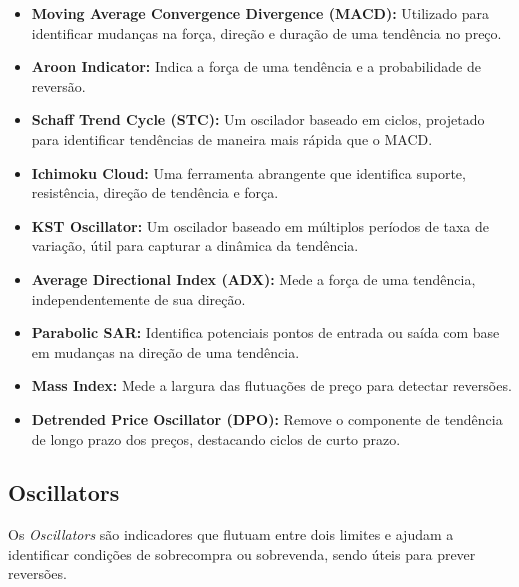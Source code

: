 \documentclass{article}
\begin{document}
\begin{itemize}
    \item \textbf{Moving Average Convergence Divergence (MACD):} Utilizado para identificar mudanças na força, direção e duração de uma tendência no preço.
    
    \item \textbf{Aroon Indicator:} Indica a força de uma tendência e a probabilidade de reversão.

    \item \textbf{Schaff Trend Cycle (STC):} Um oscilador baseado em ciclos, projetado para identificar tendências de maneira mais rápida que o MACD.

    \item \textbf{Ichimoku Cloud:} Uma ferramenta abrangente que identifica suporte, resistência, direção de tendência e força.

    \item \textbf{KST Oscillator:} Um oscilador baseado em múltiplos períodos de taxa de variação, útil para capturar a dinâmica da tendência.

    \item \textbf{Average Directional Index (ADX):} Mede a força de uma tendência, independentemente de sua direção.

    \item \textbf{Parabolic SAR:} Identifica potenciais pontos de entrada ou saída com base em mudanças na direção de uma tendência.

    \item \textbf{Mass Index:} Mede a largura das flutuações de preço para detectar reversões.

    \item \textbf{Detrended Price Oscillator (DPO):} Remove o componente de tendência de longo prazo dos preços, destacando ciclos de curto prazo.
\end{itemize}

\subsection{Oscillators}

Os \textit{Oscillators} são indicadores que flutuam entre dois limites e ajudam a identificar condições de sobrecompra ou sobrevenda, sendo úteis para prever reversões.
\end{document}
